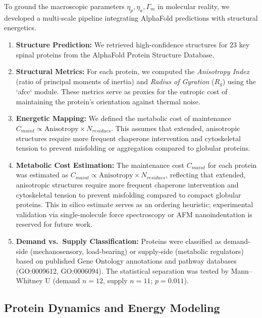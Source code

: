 \documentclass[11pt]{article}
\begin{document}
To ground the macroscopic parameters $\eta_p, \eta_a, \Gamma_m$ in molecular reality, we developed a multi-scale pipeline integrating AlphaFold predictions with structural energetics.
\begin{enumerate}
    \item \textbf{Structure Prediction:} We retrieved high-confidence structures for 23 key spinal proteins from the AlphaFold Protein Structure Database.
    \item \textbf{Structural Metrics:} For each protein, we computed the \emph{Anisotropy Index} (ratio of principal moments of inertia) and \emph{Radius of Gyration} ($R_g$) using the `afcc` module. These metrics serve as proxies for the entropic cost of maintaining the protein's orientation against thermal noise.
    \item \textbf{Energetic Mapping:} We defined the metabolic cost of maintenance $C_{maint} \propto \text{Anisotropy} \times N_{residues}$. This assumes that extended, anisotropic structures require more frequent chaperone intervention and cytoskeletal tension to prevent misfolding or aggregation compared to globular proteins.
    \item \textbf{Metabolic Cost Estimation:} The maintenance cost $C_{maint}$ for each protein was estimated as $C_{maint} \propto \text{Anisotropy} \times N_{residues}$, reflecting that extended, anisotropic structures require more frequent chaperone intervention and cytoskeletal tension to prevent misfolding compared to compact globular proteins. This in silico estimate serves as an ordering heuristic; experimental validation via single-molecule force spectroscopy or AFM nanoindentation is reserved for future work.
    \item \textbf{Demand vs.\ Supply Classification:} Proteins were classified as demand-side (mechanosensory, load-bearing) or supply-side (metabolic regulators) based on published Gene Ontology annotations and pathway databases (GO:0009612, GO:0006094). The statistical separation was tested by Mann--Whitney U (demand $n=12$, supply $n=11$; $p=0.011$).
\end{enumerate}

\subsection{Protein Dynamics and Energy Modeling}
\end{document}
